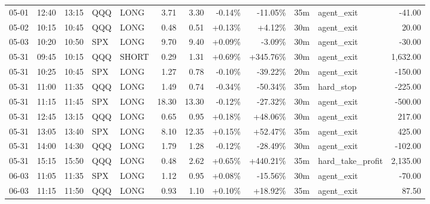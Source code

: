 \documentclass[11pt,a4paper,twoside]{article}
\begin{document}
\begin{center}
\begin{longtable}{>{\color{txtmain}}l l l l l r r r r r >{\color{txtmain}}l r}
05-01 & 12:40 & 13:15 & QQQ & LONG & 3.71 & 3.30 & \textcolor{lossred}{-0.14\%} & \textcolor{lossred}{-11.05\%} & 35m & agent\_exit & \textcolor{lossred}{-41.00} \\
05-02 & 10:15 & 10:45 & QQQ & LONG & 0.48 & 0.51 & \textcolor{wingreen}{+0.13\%} & \textcolor{wingreen}{+4.12\%} & 30m & agent\_exit & \textcolor{wingreen}{20.00} \\
05-03 & 10:20 & 10:50 & SPX & LONG & 9.70 & 9.40 & \textcolor{wingreen}{+0.09\%} & \textcolor{lossred}{-3.09\%} & 30m & agent\_exit & \textcolor{lossred}{-30.00} \\
05-31 & 09:45 & 10:15 & QQQ & SHORT & 0.29 & 1.31 & \textcolor{wingreen}{+0.69\%} & \textcolor{wingreen}{+345.76\%} & 30m & agent\_exit & \textcolor{wingreen}{1,632.00} \\
05-31 & 10:25 & 10:45 & SPX & LONG & 1.27 & 0.78 & \textcolor{lossred}{-0.10\%} & \textcolor{lossred}{-39.22\%} & 20m & agent\_exit & \textcolor{lossred}{-150.00} \\
05-31 & 11:00 & 11:35 & QQQ & LONG & 1.49 & 0.74 & \textcolor{lossred}{-0.34\%} & \textcolor{lossred}{-50.34\%} & 35m & hard\_stop & \textcolor{lossred}{-225.00} \\
05-31 & 11:15 & 11:45 & SPX & LONG & 18.30 & 13.30 & \textcolor{lossred}{-0.12\%} & \textcolor{lossred}{-27.32\%} & 30m & agent\_exit & \textcolor{lossred}{-500.00} \\
05-31 & 12:45 & 13:15 & QQQ & LONG & 0.65 & 0.95 & \textcolor{wingreen}{+0.18\%} & \textcolor{wingreen}{+48.06\%} & 30m & agent\_exit & \textcolor{wingreen}{217.00} \\
05-31 & 13:05 & 13:40 & SPX & LONG & 8.10 & 12.35 & \textcolor{wingreen}{+0.15\%} & \textcolor{wingreen}{+52.47\%} & 35m & agent\_exit & \textcolor{wingreen}{425.00} \\
05-31 & 14:00 & 14:30 & QQQ & LONG & 1.79 & 1.28 & \textcolor{lossred}{-0.12\%} & \textcolor{lossred}{-28.49\%} & 30m & agent\_exit & \textcolor{lossred}{-102.00} \\
05-31 & 15:15 & 15:50 & QQQ & LONG & 0.48 & 2.62 & \textcolor{wingreen}{+0.65\%} & \textcolor{wingreen}{+440.21\%} & 35m & hard\_take\_profit & \textcolor{wingreen}{2,135.00} \\
06-03 & 11:05 & 11:35 & SPX & LONG & 1.12 & 0.95 & \textcolor{wingreen}{+0.08\%} & \textcolor{lossred}{-15.56\%} & 30m & agent\_exit & \textcolor{lossred}{-70.00} \\
06-03 & 11:15 & 11:50 & QQQ & LONG & 0.93 & 1.10 & \textcolor{wingreen}{+0.10\%} & \textcolor{wingreen}{+18.92\%} & 35m & agent\_exit & \textcolor{wingreen}{87.50} \\

\end{longtable}
\end{center}
\end{document}
